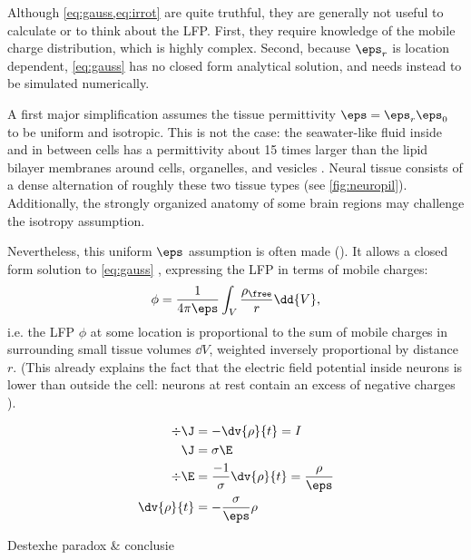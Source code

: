 Although \cref{eq:gauss,eq:irrot} are quite truthful, they are generally not useful to calculate or to think about the LFP. First, they require knowledge of the mobile charge distribution, which is highly complex.\footnotemark{} Second, because $\eps_r$ is location dependent, \cref{eq:gauss} has no closed form analytical solution, and needs instead to be simulated numerically.


A first major simplification assumes the tissue permittivity $\eps = \eps_r \eps_0$ to be uniform and isotropic. This is not the case: the seawater-like fluid inside and in between cells has a permittivity about 15 times larger than the lipid bilayer membranes around cells, organelles, and vesicles \cite{Marszalek1991,Weaver2003,Martinsen2015}. Neural tissue consists of a dense alternation of roughly these two tissue types (see \cref{fig:neuropil}). Additionally, the strongly organized anatomy of some brain regions may challenge the isotropy assumption.

Nevertheless, this uniform $\eps$ assumption is often made (\cite{Nunez2006,Plonsey2007}). It allows a closed form solution to \cref{eq:gauss} \cite{Feynman2013}, expressing the LFP in terms of mobile charges:
%
\begin{equation}
\phi = \frac{1}{4 \pi \eps} \int_V \frac{\rho_\free}{r} \dd{V},
\end{equation}
%
i.e. the LFP $\phi$ at some location is proportional to the sum of mobile charges in surrounding small tissue volumes $\dd{V}$, weighted inversely proportional by distance $r$. (This already explains the fact that the electric field potential inside neurons is lower than outside the cell: neurons at rest contain an excess of negative charges \cite{Dayan2001b}).

\begin{align*}
\div{\J} &= - \dv{\rho}{t} = I  \\
\J &= \sigma \E \\
\div{\E} &= \frac{-1}{\sigma} \dv{\rho}{t} = \frac{\rho}{\eps} \\
\dv{\rho}{t} &= - \frac{\sigma}{\eps} \rho
\end{align*}

Destexhe paradox \& conclusie
